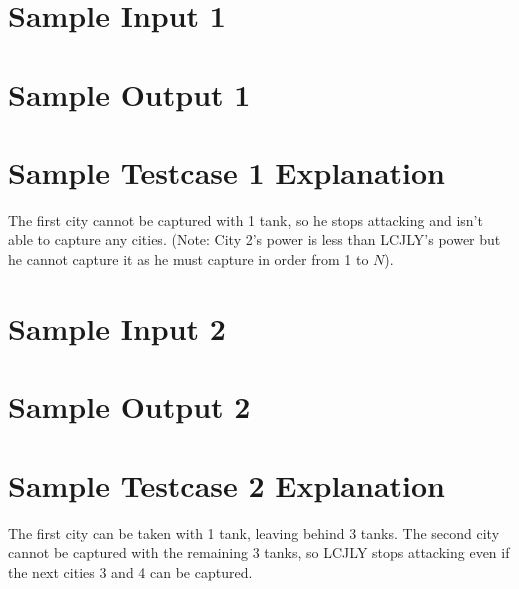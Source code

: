 \documentclass{report}
\begin{document}
\section*{Sample Input 1}

\section*{Sample Output 1}

\section*{Sample Testcase 1 Explanation}
The first city cannot be captured with 1 tank, so he stops attacking and isn't able to capture any cities. (Note: City 2's power is less than LCJLY's power but he cannot capture it as he must capture in order from 1 to $N$).

\section*{Sample Input 2}

\section*{Sample Output 2}

\section*{Sample Testcase 2 Explanation}
The first city can be taken with 1 tank, leaving behind 3 tanks. The second city cannot be captured with the remaining 3 tanks, so LCJLY stops attacking even if the next cities 3 and 4 can be captured.

\pagebreak
\hfill \break \hfill \break
\end{document}
